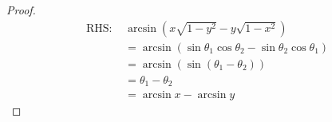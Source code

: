 \documentclass{article}
\begin{document}
\begin{proof}
	\begin{align*}
		\text{RHS: }&\arcsin\left(x\sqrt{1-y^2}-y\sqrt{1-x^2}\right) \\
		&=\arcsin\left(\sin\theta_1\cos\theta_2-\sin\theta_2\cos\theta_1\right) \\
		&=\arcsin\left(\sin\left(\theta_1-\theta_2\right)\right) \\
		&=\theta_1-\theta_2\ \\
		&=\arcsin x-\arcsin y
	\end{align*}
\end{proof}
\end{document}
